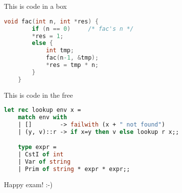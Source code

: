 \documentclass{ituhandin}
\begin{document}
%
\maketitlepage
\signpage

\chapter{}

This is code in a box

\begin{lstlisting}[language=C, caption=This is a caption]
    void fac(int n, int *res) {
        if (n == 0)     /* fac's n */
        *res = 1;
        else {
            int tmp;
            fac(n-1, &tmp);
            *res = tmp * n;
        }
    }
\end{lstlisting}


This is code in the free

\begin{lstlisting}[language=ML, frame={}]
    let rec lookup env x =
    match env with 
    | []        -> failwith (x + " not found")
    | (y, v)::r -> if x=y then v else lookup r x;;

    type expr = 
    | CstI of int
    | Var of string
    | Prim of string * expr * expr;;
\end{lstlisting}


Happy exam! :-)


\chapter{}
\section{}
\section{}
\chapter{}
\chapter{}




\label{LastPage}
\end{document}
